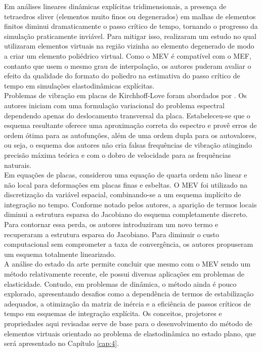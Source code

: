 \indent Em análises lineares dinâmicas explícitas tridimensionais, a presença de tetraedros sliver (elementos muito finos ou degenerados) em malhas de elementos finitos diminui dramaticamente o passo crítico de tempo, tornando o progresso da simulação praticamente inviável. Para mitigar isso, \citet{virtualelementsagglomeratedfiniteelementsincreasecriticaltimestepelastodynamicsimulations2022} realizaram um estudo no qual utilizaram elementos virtuais na região vizinha ao elemento degenerado de modo a criar um elemento poliédrico virtual. Como o MEV é compatível com o MEF, contanto que usem o mesmo grau de interpolação, os autores puderam avaliar o efeito da qualidade do formato do poliedro na estimativa do passo crítico de tempo em simulações elastodinâmicas explícitas. \\
\indent Problemas de vibração em placas de Kirchhoff-Love foram abordados por \citet{virtualelementmethodvibrationproblemkirchhoffplates2018}. Os autores iniciam com uma formulação variacional do problema espectral dependendo apenas do deslocamento transversal da placa. Estabeleceu-se que o esquema resultante oferece uma aproximação correta do espectro e provê erros de ordem ótima para as autofunções, além de uma ordem dupla para os autovalores, ou seja, o esquema dos autores não cria falsas frequências de vibração atingindo precisão máxima teórica e com o dobro de velocidade para as frequências naturais.\\
\indent Em equações de placas, \citet{adak2022convergence} considerou uma equação de quarta ordem não linear e não local para deformações em placas finas e esbeltas. O MEV foi utilizado na discretização da variável espacial, combinando-se a um esquema implícito de integração no tempo. Conforme notado pelos autores, a aparição de termos locais diminui a estrutura esparsa do Jacobiano do esquema completamente discreto. Para contornar essa perda, os autores introduziram um novo termo e recuperaram a estrutura esparsa do Jacobiano. Para diminuir o custo computacional sem comprometer a taxa de convergência, os autores propuseram um esquema totalmente linearizado. \\
\indent A análise do estado da arte permite concluir que mesmo com o MEV sendo um método relativamente recente, ele possui diversas aplicações em problemas de elasticidade. Contudo, em problemas de dinâmica, o método ainda é pouco explorado, apresentando desafios como a dependência de termos de estabilização adequados, a otimização da matriz de inércia e a eficiência de passos críticos de tempo em esquemas de integração explícita. Os conceitos, projetores e propriedades aqui revisadas serve de base para o desenvolvimento do método de elementos virtuais orientado ao problema de elastodinâmica no estado plano, que será apresentado no Capítulo \ref{cap:4}. 
